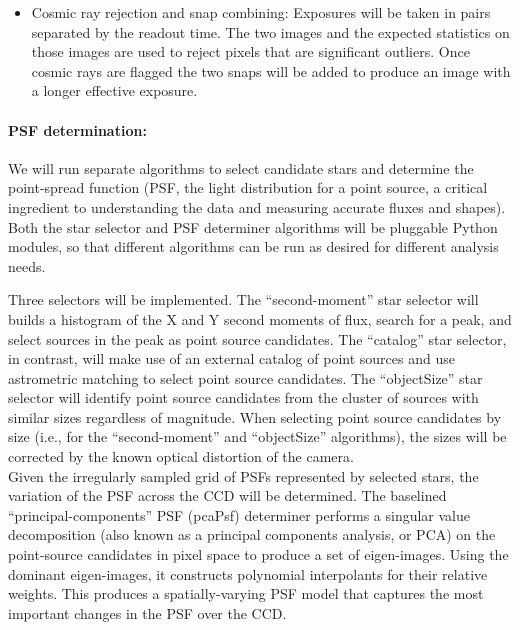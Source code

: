 \documentclass[12pt]{article}
\begin{document}
\begin{itemize}
\item Cosmic ray rejection and snap combining: Exposures will be taken in pairs separated by the readout time. The two images and the expected statistics on those images are used to reject pixels that are significant outliers. Once cosmic rays are flagged the two snaps will be added to produce an image with a longer effective exposure.  %
\end{itemize}

\paragraph{PSF determination:} We will run separate algorithms to select candidate stars and determine the point-spread function (PSF, the light distribution for a point source, a critical ingredient to understanding the data and measuring accurate fluxes and shapes).  Both the star selector and PSF determiner algorithms will be pluggable Python modules, so that different algorithms can be run as desired for different analysis needs.

Three selectors will be implemented. %
The ``second-moment'' star selector will builds a histogram of the X and Y second moments of flux, search for a peak, and select sources in the peak as point source candidates.  The ``catalog'' star selector, in contrast, will make use of an external catalog of point sources and use astrometric matching to select point source candidates.  The ``objectSize'' star selector will identify point source candidates from the cluster of sources with similar sizes regardless of magnitude.  When selecting point source candidates by size (i.e., for the ``second-moment'' and ``objectSize'' algorithms), the sizes will be corrected by the known optical distortion of the camera.  %
\\

Given the irregularly sampled grid of PSFs represented by selected stars, the variation of the PSF across the CCD will be determined. The baselined ``principal-components'' PSF (pcaPsf) determiner performs a singular value decomposition (also known as a principal components analysis, or PCA) on the point-source candidates in pixel space to produce a set of eigen-images.  Using the dominant eigen-images, it constructs polynomial interpolants for their relative weights.  This produces a spatially-varying PSF model that captures the most important changes in the PSF over the CCD.
\\
\end{document}
